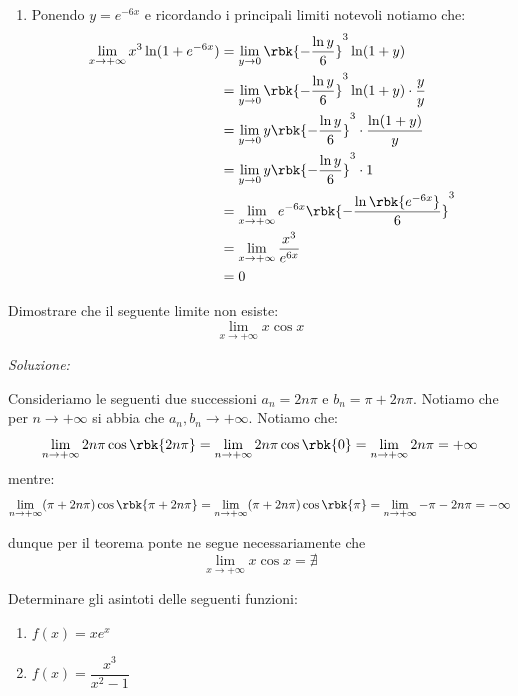 \documentclass[a4paper, 12pt]{report}
\begin{document}
\begin{enumerate}
        \item Ponendo $y = e^{-6x}$ e ricordando i principali limiti notevoli notiamo che:
        \[\begin{split}
            \lim\limits_{x \to +\infty} x^3 \ln (1+e^{-6x}) &= \lim\limits_{y \to 0} \rbk{-\frac{\ln y}{6}}^3 \ln (1+y) \\
            &= \lim\limits_{y \to 0} \rbk{-\frac{\ln y}{6}}^3 \ln (1+y) \cdot \frac{y}{y} \\
            &= \lim\limits_{y \to 0} y\rbk{-\frac{\ln y}{6}}^3 \cdot \frac{\ln (1+y)}{y} \\
            &= \lim\limits_{y \to 0} y\rbk{-\frac{\ln y}{6}}^3 \cdot 1 \\
            &= \lim\limits_{x \to +\infty} e^{-6x}\rbk{-\frac{\ln \rbk{e^{-6x}}}{6}}^3 \\
            &= \lim\limits_{x \to +\infty} \frac{x^3}{e^{6x}} \\
            &= 0
        \end{split}\]

    \end{enumerate}

    \begin{framedprob}{}
        Dimostrare che il seguente limite non esiste:
        \[\lim_{x \to +\infty} x\cos x\]
    \end{framedprob}

    \textit{Soluzione:}

    Consideriamo le seguenti due successioni $a_n = 2n\pi$ e $b_n = \pi + 2n\pi$. Notiamo che per $n \to +\infty$ si abbia che $a_n, b_n \to +\infty$. Notiamo che:
    \[\lim_{n \to +\infty}  2n\pi \cos \rbk{2n\pi} = \lim_{n \to +\infty}  2n\pi \cos \rbk{0} = \lim_{n \to +\infty}  2n\pi = +\infty\]
    mentre:
    \[\lim_{n \to +\infty}  (\pi+2n\pi) \cos \rbk{\pi+2n\pi} = \lim_{n \to +\infty}  (\pi + 2n\pi) \cos \rbk{\pi} =  \lim_{n \to +\infty}  -\pi-2n\pi = -\infty\]

    dunque per il teorema ponte ne segue necessariamente che
    \[\lim_{x \to +\infty} x\cos x = \nexists\]

    \newpage


    \begin{framedprob}{}
        Determinare gli asintoti delle seguenti funzioni:
        \begin{enumerate}
            \item $f(x) = xe^x$
            \item $f(x) = \dfrac{x^3}{x^2-1}$
        \end{enumerate}
    \end{framedprob}
\end{document}
